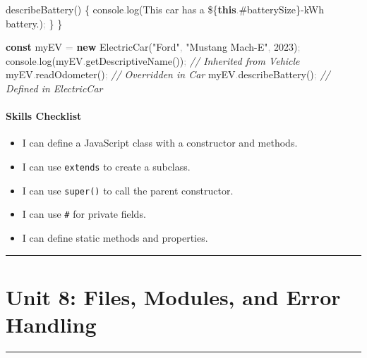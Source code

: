 \documentclass[
  justified,
  openright,
]{tufte-book}
\let\subsection\paragraph
\let\paragraph\paragraph
\newcommand{\KeywordTok}[1]{\textcolor{CodeKeyword}{\textbf{#1}}}  %
\newcommand{\StringTok}[1]{\textcolor{CodeString}{#1}}              %
\newcommand{\CommentTok}[1]{\textcolor{CodeComment}{\textit{#1}}}  %
\newcommand{\CodeNumTok}[1]{\textcolor{CodeNumber}{#1}}             %
\newcommand{\CodeFuncTok}[1]{\textcolor{CodeKeyword}{#1}}           %
\newcommand{\CodeTypeTok}[1]{\textcolor{CodeType}{#1}}              %
\newcommand{\OperatorTok}[1]{\textcolor{DarkGray}{#1}}              %
\newenvironment{Shaded}{%
  \begin{mdframed}[style=TufteCode]%
}{%
  \end{mdframed}%
}
\let\subsection\paragraph
\let\paragraph\paragraph
\providecommand{\tightlist}{%
  \setlength{\itemsep}{0pt}\setlength{\parskip}{0pt}}
\begin{document}
\begin{Shaded}
\begin{Highlighting}[]
  \CodeFuncTok{describeBattery}() \{
    console\OperatorTok{.}\CodeFuncTok{log}(\StringTok{\textasciigrave{}This car has a }\StringTok{\$\{}\KeywordTok{this}\OperatorTok{.}\#\CodeTypeTok{batterySize}\StringTok{\}}\StringTok{{-}kWh battery.\textasciigrave{}})\OperatorTok{;}
  \}
\}
 
\KeywordTok{const} myEV \OperatorTok{=} \KeywordTok{new} \CodeFuncTok{ElectricCar}(\StringTok{"Ford"}\OperatorTok{,} \StringTok{"Mustang Mach{-}E"}\OperatorTok{,} \CodeNumTok{2023})\OperatorTok{;}
console\OperatorTok{.}\CodeFuncTok{log}(myEV\OperatorTok{.}\CodeFuncTok{getDescriptiveName}())\OperatorTok{;} \CommentTok{// Inherited from Vehicle}
myEV\OperatorTok{.}\CodeFuncTok{readOdometer}()\OperatorTok{;} \CommentTok{// Overridden in Car}
myEV\OperatorTok{.}\CodeFuncTok{describeBattery}()\OperatorTok{;} \CommentTok{// Defined in ElectricCar}
\end{Highlighting}
\end{Shaded}

\subsection{Skills Checklist}\label{skills-checklist-64}

\begin{itemize}
\tightlist
\item[$\square$]
  I can define a JavaScript class with a constructor and methods.
\item[$\square$]
  I can use \texttt{extends} to create a subclass.
\item[$\square$]
  I can use \texttt{super()} to call the parent constructor.
\item[$\square$]
  I can use \texttt{\#} for private fields.
\item[$\square$]
  I can define static methods and properties.
\end{itemize}

\begin{center}\rule{0.5\linewidth}{0.5pt}\end{center}

\section{Unit 8: Files, Modules, and Error
Handling}\label{unit-8-files-modules-and-error-handling-1}

\begin{center}\rule{0.5\linewidth}{0.5pt}\end{center}
\end{document}
